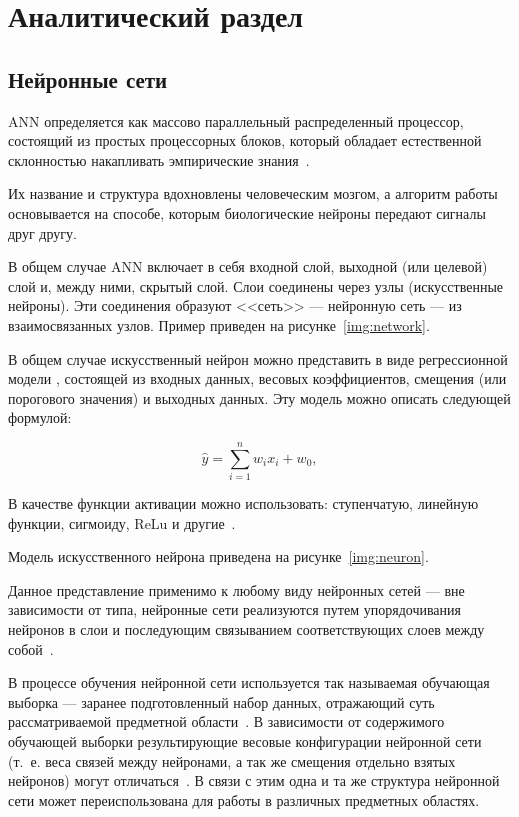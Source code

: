 \chapter{Аналитический раздел}

\section{Нейронные сети}

ANN определяется как массово параллельный распределенный процессор, состоящий из простых процессорных блоков, который обладает естественной склонностью накапливать эмпирические знания~\cite{ann}. 

Их название и структура вдохновлены человеческим мозгом, а алгоритм работы основывается на способе, которым биологические нейроны передают сигналы друг другу.

В общем случае ANN включает в себя входной слой, выходной (или целевой) слой и, между ними, скрытый слой. Слои соединены через узлы (искусственные нейроны). Эти соединения образуют <<сеть>> --- нейронную сеть --- из взаимосвязанных узлов. Пример приведен на рисунке~\ref{img:network}.


В общем случае искусственный нейрон можно представить в виде регрессионной модели \cite{activationfuncs}, состоящей из входных данных, весовых коэффициентов, смещения (или порогового значения) и выходных данных. Эту модель можно описать следующей формулой:

\begin{equation}
	\label{eq:nn0}
	\hat{y} = \sum_{i=1}^{n}w_ix_i + w_0,
\end{equation}

В качестве функции активации можно использовать: ступенчатую, линейную функции, сигмоиду, ReLu и другие~\cite{activationfuncs}.

Модель искусственного нейрона приведена на рисунке~\ref{img:neuron}.


Данное представление применимо к любому виду нейронных сетей --- вне зависимости от типа, нейронные сети реализуются путем упорядочивания нейронов в слои и последующим связыванием соответствующих слоев между собой~\cite{ann}.

В процессе обучения нейронной сети используется так называемая обучающая выборка --- заранее подготовленный набор данных, отражающий суть рассматриваемой предметной области~\cite{ann}. В зависимости от содержимого обучающей выборки результирующие весовые конфигурации нейронной сети (т.~е. веса связей между нейронами, а так же смещения отдельно взятых нейронов) могут отличаться~\cite{ann}. В связи с этим одна и та же структура нейронной сети может переиспользована для работы в различных предметных областях.

